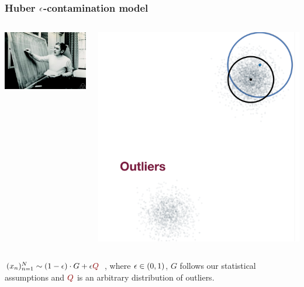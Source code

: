 \documentclass[hyperref={colorlinks = true},unknownkeysallowed]{beamer}
\let\oldcitep=\citep
\renewcommand\citep[1]{\hypersetup{linkcolor=UBCblue}\hyperlink{#1}{\oldcitep{#1}}}
\begin{document}
\begin{frame}
	\frametitle{Huber $\epsilon$-contamination model}
		\begin{columns}
		\begin{column}{.39\textwidth}
			 \hfill \includegraphics[width=1.\textwidth]{figs/Huber.jpg}\\ 
		\end{column}
		\begin{column}{.69\textwidth}
			\hfill \includegraphics[width=.5\textwidth]{figs/contaminated-gaussian.png}\\ 
		\end{column}
	\end{columns}
$(x_n)_{n=1}^{N}\sim (1-\eps)\cdot G + \eps \color{darkred}{Q}$~\citep{huber92},
where $\epsilon \in (0,1)$, $G$ follows our statistical assumptions and $\color{darkred}{Q}$ is an arbitrary distribution of outliers.
\end{frame}
\end{document}
